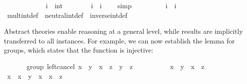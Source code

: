 \begin{isabellebody}
%
\isadelimproof
\ \ \ \ %
\endisadelimproof
%
\isatagproof
{}\isamarkupfalse%
\isanewline
\ \ \ \ \ \ \isamarkupfalse%
\ i\ {\isacharcolon}{\isacharcolon}\ int\isanewline
\ \ \ \ \ \ \isamarkupfalse%
\ {\isachardoublequoteopen}{\isacharminus}i\ {\isacharplus}\ i\ {\isacharequal}\ {}{\isachardoublequoteclose}\ \isamarkupfalse%
\ simp\isanewline
\ \ \ \ \ \ \isamarkupfalse%
\ \isamarkupfalse%
\ {\isachardoublequoteopen}i{\isasymdiv}\ {\isasymotimes}\ i\ {\isacharequal}\ {\isasymone}{\isachardoublequoteclose}\ \isamarkupfalse%
\ mult{\isacharunderscore}int{\isacharunderscore}def\ \ neutral{\isacharunderscore}int{\isacharunderscore}def\ \ inverse{\isacharunderscore}int{\isacharunderscore}def\ \isacommand{{\isachardot}}\isamarkupfalse%
\isanewline
\ \ \ \ \isamarkupfalse%
%
\endisatagproof
{\isafoldproof}%
%
\isadelimproof
%
\endisadelimproof
%
\isamarkuptrue%
%
\isamarkuptrue%
%
\begin{isamarkuptext}%
%
\end{isamarkuptext}%
\isamarkuptrue%
%
\isamarkuptrue%
%
\begin{isamarkuptext}%
Abstract theories enable reasoning at a general level, while results
  are implicitly transferred to all instances.  For example, we can
  now establish the  lemma for groups, which
  states that the function  is injective:%
\end{isamarkuptext}%
\isamarkuptrue%
\ \ \ \ \isamarkupfalse%
\ {\isacharparenleft}\ group{\isacharparenright}\ left{\isacharunderscore}cancel{\isacharcolon}\ {\isachardoublequoteopen}x\ \isactrlloc {\isasymotimes}\ y\ {\isacharequal}\ x\ \isactrlloc {\isasymotimes}\ z\ {\isasymlongleftrightarrow}\ y\ {\isacharequal}\ z{\isachardoublequoteclose}\isanewline
%
\isadelimproof
\ \ \ \ %
\endisadelimproof
%
\isatagproof
{}\isamarkupfalse%
\isanewline
\ \ \ \ \isamarkupfalse%
\ {\isachardoublequoteopen}x\ \isactrlloc {\isasymotimes}\ y\ {\isacharequal}\ x\ \isactrlloc {\isasymotimes}\ z{\isachardoublequoteclose}\isanewline
\ \ \ \ \ \ \ \ \isamarkupfalse%
\ \isamarkupfalse%
\ {\isachardoublequoteopen}x\isactrlloc {\isasymdiv}\ \isactrlloc {\isasymotimes}\ {\isacharparenleft}x\ \isactrlloc {\isasymotimes}\ y{\isacharparenright}\ {\isacharequal}\ x\isactrlloc {\isasymdiv}\ \isactrlloc {\isasymotimes}\ {\isacharparenleft}x\ \isactrlloc {\isasymotimes}\ z{\isacharparenright}{\isachardoublequoteclose}\ \isamarkupfalse%

\end{isabellebody}
